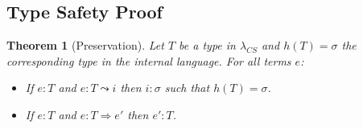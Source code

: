 \documentclass[10pt,preprint]{sigplanconf}
\newtheorem{thm}{Theorem}
\newtheorem{lem}[thm]{Lemma}
\theoremstyle{definition}
\newcommand{\str}{ {\tt string} }
\newcommand{\reduces}{ \Rightarrow }
\newcommand{\ireduces}{ \leadsto }
\newcommand{\val}{ \ {\tt val} }
\newcommand{\strf}[1]{``#1"}
\newcommand{\lcs}{\lambda_{CS}}
\begin{document}
\twocolumn

\subsection{Type Safety Proof}


\begin{thm}[Preservation]
  Let $T$ be a type in $\lcs$ and $h(T)=\sigma$ the corresponding type in the internal language.
  For all terms $e$:
  \begin{itemize}
    \item If $e:T$ and $e:T \ireduces i$ then $i : \sigma$ such that $h(T) = \sigma$.
    \item If $e:T$ and $e:T \reduces e'$ then $e':T$.
  \end{itemize}
\end{thm}
\end{document}
